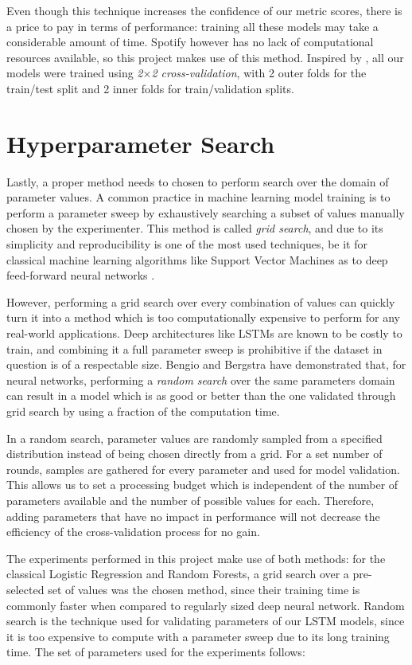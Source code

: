 \documentclass{kththesis}
\begin{document}
Even though this technique increases the confidence of our metric scores, there is a price to pay in terms of performance: training all these models may take a considerable amount of time. Spotify however has no lack of computational resources available, so this project makes use of this method. Inspired by \citep{Burez2009}, all our models were trained using \emph{2$\times$2 cross-validation}, with 2 outer folds for the train/test split and 2 inner folds for train/validation splits.

\section{Hyperparameter Search}

Lastly, a proper method needs to chosen to perform search over the domain of parameter values. A common practice in machine learning model training is to perform a parameter sweep by exhaustively searching a subset of values manually chosen by the experimenter. This method is called \emph{grid search}, and due to its simplicity and reproducibility is one of the most used techniques, be it for classical machine learning algorithms like Support Vector Machines as to deep feed-forward neural networks \citep{larochelle2007empirical}.

However, performing a grid search over every combination of values can quickly turn it into a method which is too computationally expensive to perform for any real-world applications. Deep architectures like LSTMs are known to be costly to train, and combining it a full parameter sweep is prohibitive if the dataset in question is of a respectable size. Bengio and Bergstra\citep{bergstra2012random} have demonstrated that, for neural networks, performing a \emph{random search} over the same parameters domain can result in a model which is as good or better than the one validated through grid search by using a fraction of the computation time. 

In a random search, parameter values are randomly sampled from a specified distribution instead of being chosen directly from a grid. For a set number of rounds, samples are gathered for every parameter and used for model validation. This allows us to set a processing budget which is independent of the number of parameters available and the number of possible values for each. Therefore, adding parameters that have no impact in performance will not decrease the efficiency of the cross-validation process for no gain. 

The experiments performed in this project make use of both methods: for the classical Logistic Regression and Random Forests, a grid search over a pre-selected set of values was the chosen method, since their training time is commonly faster when compared to regularly sized deep neural network. Random search is the technique used for validating parameters of our LSTM models, since it is too expensive to compute with a parameter sweep due to its long training time. The set of parameters used for the experiments follows:
\end{document}
